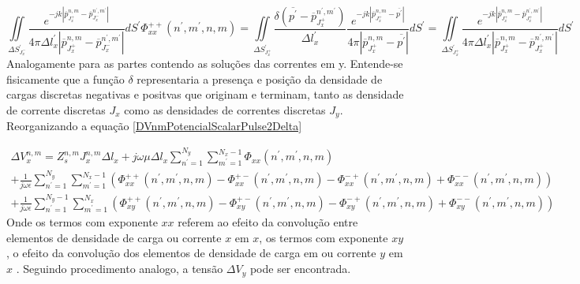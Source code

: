 \documentclass[
	12pt,				%
	openright,			%
	oneside,			%
	a4paper,			%
	english,			%
	brazil				%
	]{abntex2}
\begin{document}
\begin{apendicesenv}
\begin{subequations}
\begin{equation}
  \iint\limits_{{\Delta S}^{'}_{J_x^{-}}}  \frac{e^{-j k |\overline{p}_{J_{x}^{+}}^{n,m}-\overline{p}_{J_{x}^{-}}^{n^{'},m^{'}}|}}{4 \pi {\Delta l}_x^{'} |\overline{p}_{J_{x}^{+}}^{n,m}-\overline{p}_{J_{x}^{-}}^{n^{'},m^{'}}|} dS^{'}
\end{equation}
\begin{equation}
    \Phi_{xx}^{++}(n^{'},m^{'},n,m)=\iint\limits_{{\Delta S}^{'}_{J_x^{+}}}     \frac{ \delta(\overline{p^{'}}-\overline{p}^{n^{'},m^{'}}_{J_x^{+}})}{{\Delta l}_x^{'} } \frac{e^{-j k |\overline{p}_{{J_x^{+}}}^{n,m}-\overline{p^{'}}|}}{4 \pi |\overline{p}_{{J_x^{+}}}^{n,m}-\overline{p^{'}}|} dS^{'}  =
 \iint\limits_{{\Delta S}^{'}_{J_x^{+}}}    \frac{e^{-j k |\overline{p}_{J_{x}^{+}}^{n,m}-\overline{p}_{J_{x}^{+}}^{n^{'},m^{'}}|}}{4 \pi {\Delta l}_x^{'} |\overline{p}_{J_{x}^{+}}^{n,m}-\overline{p}_{J_{x}^{+}}^{n^{'},m^{'}}|} dS^{'}
\end{equation}
\end{subequations}
Analogamente para as partes contendo as soluções das correntes em y.
Entende-se fisicamente que a função $\delta$ representaria a presença e posição da densidade de cargas discretas negativas e positvas que originam e terminam, tanto as densidade de corrente discretas $J_x$ como as  densidades de correntes discretas $J_y$. Reorganizando a equação \ref{DVnmPotencialScalarPulse2Delta}

\begin{equation}\label{TensãoCadaElementoNM}
\begin{aligned}
    \Delta V_{x}^{n,m}=Z_s^{n,m}  J_{x}^{n,m} \Delta l_x 
    + 
    j\omega \mu  \Delta l_x \sum^{N_y}_{n^{'}=1} \sum^{N_x -1}_{m^{'}=1} \Phi_{xx}(n^{'},m^{'},n,m) \\  
    +
    \frac{1}{j \omega \epsilon} \sum^{N_y}_{n^{'}=1} \sum^{N_x -1}_{m^{'}=1}(\Phi_{xx}^{++}(n^{'},m^{'},n,m)-\Phi_{xx}^{+-}(n^{'},m^{'},n,m)-\Phi_{xx}^{-+}(n^{'},m^{'},n,m)+\Phi_{xx}^{--}(n^{'},m^{'},n,m)) \\
    +
    \frac{1}{j \omega \epsilon} \sum^{N_y-1}_{n^{'}=1} \sum^{N_x}_{m^{'}=1}(\Phi_{xy}^{++}(n^{'},m^{'},n,m)-\Phi_{xy}^{+-}(n^{'},m^{'},n,m)-\Phi_{xy}^{-+}(n^{'},m^{'},n,m)+\Phi_{xy}^{--}(n^{'},m^{'},n,m))
\end{aligned}
\end{equation}
Onde os termos com exponente $xx$ referem ao efeito da convolução entre elementos de densidade de carga ou corrente $x$ em $x$,  os termos com exponente $xy$, o efeito da convolução dos elementos de densidade de carga em ou corrente $y$ em $x$ . Seguindo procedimento analogo, a tensão $\Delta V_y$ pode ser encontrada. 


\end{apendicesenv}
\end{document}
